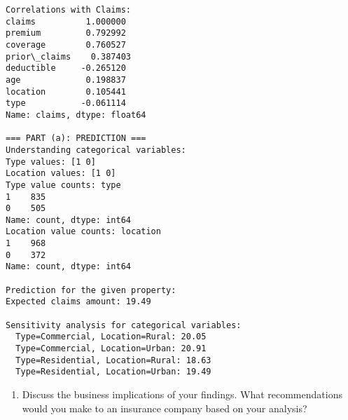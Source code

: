 \documentclass[8pt, twocolumn]{extarticle}
\providecommand{\tightlist}{%
      \setlength{\itemsep}{0pt}\setlength{\parskip}{0pt}}
\begin{document}
    \begin{Verbatim}[commandchars=\\\{\}]
Correlations with Claims:
claims          1.000000
premium         0.792992
coverage        0.760527
prior\_claims    0.387403
deductible     -0.265120
age             0.198837
location        0.105441
type           -0.061114
Name: claims, dtype: float64

=== PART (a): PREDICTION ===
Understanding categorical variables:
Type values: [1 0]
Location values: [1 0]
Type value counts: type
1    835
0    505
Name: count, dtype: int64
Location value counts: location
1    968
0    372
Name: count, dtype: int64

Prediction for the given property:
Expected claims amount: 19.49

Sensitivity analysis for categorical variables:
  Type=Commercial, Location=Rural: 20.05
  Type=Commercial, Location=Urban: 20.91
  Type=Residential, Location=Rural: 18.63
  Type=Residential, Location=Urban: 19.49
    \end{Verbatim}

    \begin{enumerate}
\def\labelenumi{(\alph{enumi})}
\setcounter{enumi}{1}
\tightlist
\item
  Discuss the business implications of your findings. What
  recommendations would you make to an insurance company based on your
  analysis?
\end{enumerate}
\end{document}
